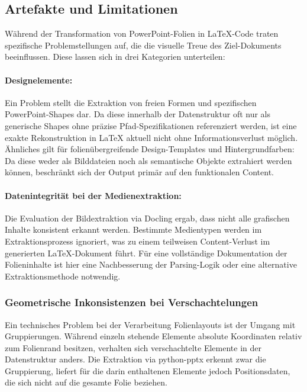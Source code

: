 \documentclass[a4paper]{article}
\begin{document}
\subsection{Artefakte und Limitationen} Während der Transformation von PowerPoint-Folien in LaTeX-Code traten spezifische Problemstellungen auf, die die visuelle Treue des Ziel-Dokuments beeinflussen. Diese lassen sich in drei Kategorien unterteilen:

\paragraph{Designelemente:} Ein Problem stellt die Extraktion von freien Formen und spezifischen PowerPoint-Shapes dar. Da diese innerhalb der Datenstruktur oft nur als generische Shapes ohne präzise Pfad-Spezifikationen referenziert werden, ist eine exakte Rekonstruktion in LaTeX aktuell nicht ohne Informationsverlust möglich. Ähnliches gilt für folienübergreifende Design-Templates und Hintergrundfarben: Da diese weder als Bilddateien noch als semantische Objekte extrahiert werden können, beschränkt sich der Output primär auf den funktionalen Content.


\paragraph{Datenintegrität bei der Medienextraktion:} Die Evaluation der Bildextraktion via Docling ergab, dass nicht alle grafischen Inhalte konsistent erkannt werden. Bestimmte Medientypen werden im Extraktionsprozess ignoriert, was zu einem teilweisen Content-Verlust im generierten LaTeX-Dokument führt. Für eine vollständige Dokumentation der Folieninhalte ist hier eine Nachbesserung der Parsing-Logik oder eine alternative Extraktionsmethode notwendig.

\subsubsection{Geometrische Inkonsistenzen bei Verschachtelungen}


Ein technisches Problem bei der Verarbeitung Folienlayouts ist der Umgang mit Gruppierungen. Während einzeln stehende Elemente absolute Koordinaten relativ zum Folienrand besitzen, verhalten sich verschachtelte Elemente in der Datenstruktur anders. Die Extraktion via {python-pptx} erkennt zwar die Gruppierung, liefert für die darin enthaltenen Elemente jedoch Positionsdaten, die sich nicht auf die gesamte Folie beziehen.
\end{document}
